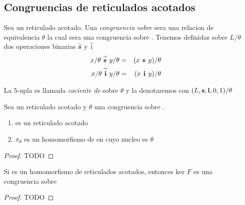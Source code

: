   \subsection{Congruencias de reticulados acotados}
  \begin{definition}
    Sea \reticulAcot un reticulado acotado. Una \emph{congruencia sobre} \reticulAcot sera una
    relacion de equivalencia $\theta$ la cual sera una congruencia sobre \reticulAlg. Tenemos definidas sobre
    $L/\theta$ dos operaciones binarias $\overset{\sim}{\textbf{s}}$ y $\overset{\sim}{\text{i}}$
    \begin{alignat*}{2}
      x/\theta\overset{\sim}{\textbf{ s }}y/\theta &=& (x\textbf{ s }y)/\theta\\
      x/\theta\overset{\sim}{\textbf{ i }}y/\theta &=& (x\textbf{ i }y)/\theta
    \end{alignat*}

    La 5-upla  es llamada
    \emph{cociente de} \reticulAcot sobre $\theta$ y la denotaremos con $(L, \textbf{s}, \textbf{i}, 0, 1)/\theta$
  \end{definition}

  \begin{lemma}
    Sea \reticulAcot un reticulado acotado y $\theta$ una congruencia sobre \reticulAcot.
    \begin{enumerate}
      \item {} es un reticulado acotado
      \item $\pi_\theta$ es un homomorfismo de \reticulAcot en  cuyo nucleo es $\theta$
    \end{enumerate}
  \end{lemma}

  \begin{proof}
    TODO
  \end{proof}

  \begin{lemma}
    Si  es un homomorfismo de
    reticulados acotados, entonces ker $F$ es una congruencia sobre \reticulAcot
  \end{lemma}
  \begin{proof}
    TODO
  \end{proof}

